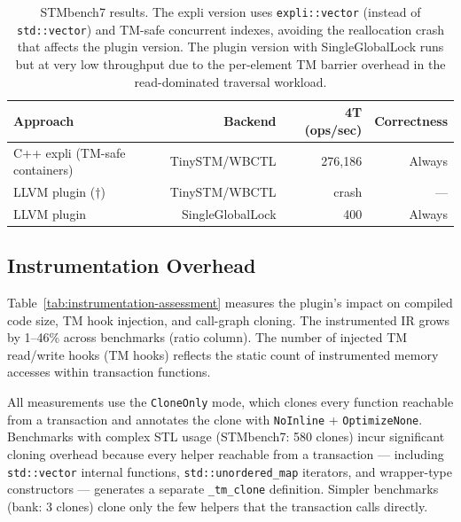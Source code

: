 \documentclass[article,12pt]{article}
\begin{document}
\begin{table}[h]
\centering
\begin{tabular}{lrrr}
\toprule
Approach & Backend & 4T (ops/sec) & Correctness \\
\midrule
C++ expli (TM-safe containers) & TinySTM/WBCTL & 276,186 & Always \\
LLVM plugin ($\dagger$) & TinySTM/WBCTL & crash & --- \\
LLVM plugin & SingleGlobalLock & 400 & Always \\
\bottomrule
\end{tabular}
\caption{STMbench7 results.  The expli version uses \texttt{expli::vector}
(instead of \texttt{std::vector}) and TM-safe concurrent indexes, avoiding
the reallocation crash that affects the plugin version.  The plugin version
with SingleGlobalLock runs but at very low throughput due to the per-element
TM barrier overhead in the read-dominated traversal workload.}
\end{table}

\subsection{Instrumentation Overhead}

Table~\ref{tab:instrumentation-assessment} measures the plugin's
impact on compiled code size, TM hook injection, and call-graph cloning.
The instrumented IR grows by 1--46\% across benchmarks (ratio
column).  The number of injected TM read/write hooks (TM hooks)
reflects the static count of instrumented memory accesses within
transaction functions.

All measurements use the \texttt{CloneOnly} mode, which clones every
function reachable from a transaction and annotates the clone with
\texttt{NoInline} + \texttt{OptimizeNone}.  Benchmarks with complex
STL usage (STMbench7: 580 clones) incur significant cloning overhead
because every helper reachable from a transaction --- including
\texttt{std::vector} internal functions, \texttt{std::unordered\_map}
iterators, and wrapper-type constructors --- generates a separate
\texttt{\_tm\_clone} definition.  Simpler benchmarks (bank: 3 clones)
clone only the few helpers that the transaction calls directly.
\end{document}
